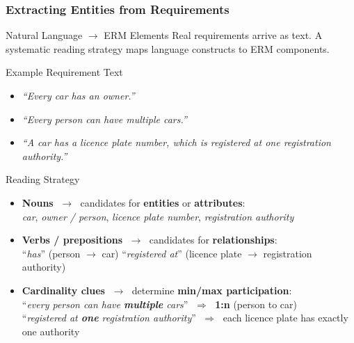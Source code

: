 \begin{frame}
  \frametitle{Extracting Entities from Requirements}

  \begin{block}{Natural Language $\to$ ERM Elements}
    Real requirements arrive as text. A systematic reading strategy maps language constructs to ERM components.
  \end{block}

  \begin{examples}{Example Requirement Text}
    \begin{itemize}
      \item \textit{``Every car has an owner.''}
      \item \textit{``Every person can have multiple cars.''}
      \item \textit{``A car has a licence plate number, which is registered at one registration authority.''}
    \end{itemize}
  \end{examples}

  \begin{block}{Reading Strategy}
    \begin{itemize}
      \item \textbf{Nouns} $\;\to\;$ candidates for \textbf{entities} or \textbf{attributes}:\\
            \textit{car}, \textit{owner / person}, \textit{licence plate number}, \textit{registration authority}
      \item \textbf{Verbs / prepositions} $\;\to\;$ candidates for \textbf{relationships}:\\
            ``\textit{has}'' (person $\to$ car) \quad ``\textit{registered at}'' (licence plate $\to$ registration authority)
      \item \textbf{Cardinality clues} $\;\to\;$ determine \textbf{min/max participation}:\\
            ``\textit{every person can have \textbf{multiple} cars}'' $\;\Rightarrow\;$ \textbf{1:n} (person to car)\\
            ``\textit{registered at \textbf{one} registration authority}'' $\;\Rightarrow\;$ each licence plate has exactly one authority
    \end{itemize}
  \end{block}
\end{frame}

